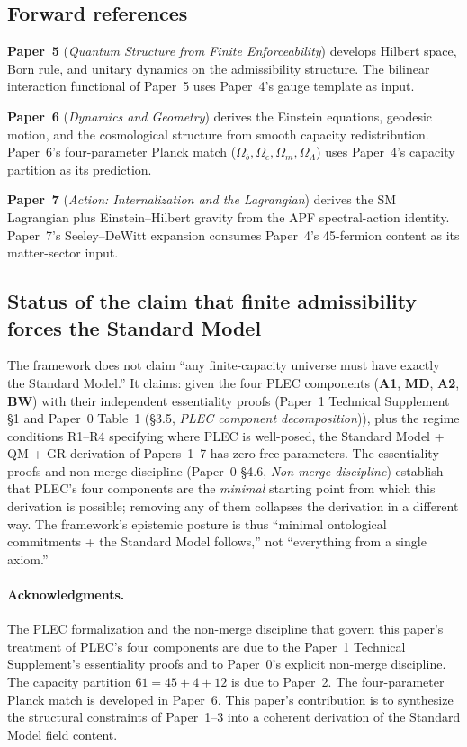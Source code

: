 \documentclass[11pt]{article}
\newcommand{\Aone}{\textbf{A1}}
\newcommand{\Atwo}{\textbf{A2}}
\newcommand{\MD}{\textbf{MD}}
\newcommand{\BW}{\textbf{BW}}
\newcommand{\paperref}[2]{\textbf{Paper~#1} (\textit{#2})}
\theoremstyle{definition}
\begin{document}
\subsection{Forward references}\label{sec:conclusion_forward}

\paperref{5}{Quantum Structure from Finite Enforceability} develops Hilbert space, Born rule, and unitary dynamics on the admissibility structure. The bilinear interaction functional of Paper~5 uses Paper~4's gauge template as input.

\paperref{6}{Dynamics and Geometry} derives the Einstein equations, geodesic motion, and the cosmological structure from smooth capacity redistribution. Paper~6's four-parameter Planck match ($\Omega_b, \Omega_c, \Omega_m, \Omega_\Lambda$) uses Paper~4's capacity partition as its prediction.

\paperref{7}{Action: Internalization and the Lagrangian} derives the SM Lagrangian plus Einstein--Hilbert gravity from the APF spectral-action identity. Paper~7's Seeley--DeWitt expansion consumes Paper~4's 45-fermion content as its matter-sector input.

\subsection{Status of the claim that finite admissibility forces the Standard Model}\label{sec:conclusion_status}

The framework does not claim ``any finite-capacity universe must have exactly the Standard Model.'' It claims: given the four PLEC components (\Aone{}, \MD{}, \Atwo{}, \BW{}) with their independent essentiality proofs (Paper~1 Technical Supplement \S1 and Paper~0 Table~1 (\S3.5, \emph{PLEC component decomposition})), plus the regime conditions R1--R4 specifying where PLEC is well-posed, the Standard Model + QM + GR derivation of Papers~1--7 has zero free parameters. The essentiality proofs and non-merge discipline (Paper~0 \S4.6, \emph{Non-merge discipline}) establish that PLEC's four components are the \emph{minimal} starting point from which this derivation is possible; removing any of them collapses the derivation in a different way. The framework's epistemic posture is thus ``minimal ontological commitments + the Standard Model follows,'' not ``everything from a single axiom.''

\paragraph{Acknowledgments.} The PLEC formalization and the non-merge discipline that govern this paper's treatment of PLEC's four components are due to the Paper~1 Technical Supplement's essentiality proofs and to Paper~0's explicit non-merge discipline. The capacity partition $61 = 45 + 4 + 12$ is due to Paper~2. The four-parameter Planck match is developed in Paper~6. This paper's contribution is to synthesize the structural constraints of Paper~1--3 into a coherent derivation of the Standard Model field content.
\end{document}
